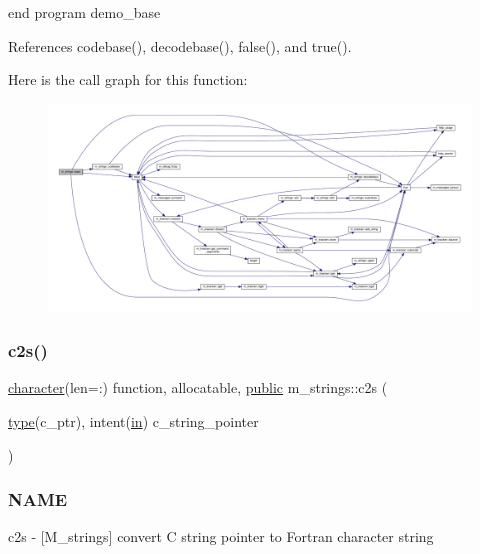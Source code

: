 end program demo\+\_\+base 

References codebase(), decodebase(), false(), and true().

Here is the call graph for this function\+:
\nopagebreak
\begin{figure}[H]
\begin{center}
\leavevmode
\includegraphics[width=350pt]{namespacem__strings_a635ef6f1dd73400e7b339392886d6357_cgraph}
\end{center}
\end{figure}
\mbox{\label{namespacem__strings_a0a8c0c16a34208351523068686cb743b}} 
\subsubsection{\texorpdfstring{c2s()}{c2s()}}
{\footnotesize\ttfamily \hyperlink{option__stopwatch_83_8txt_abd4b21fbbd175834027b5224bfe97e66}{character}(len=\+:) function, allocatable, \hyperlink{M__stopwatch_83_8txt_a2f74811300c361e53b430611a7d1769f}{public} m\+\_\+strings\+::c2s (\begin{DoxyParamCaption}\item[{\hyperlink{stop__watch_83_8txt_a70f0ead91c32e25323c03265aa302c1c}{type}(c\+\_\+ptr), intent(\hyperlink{M__journal_83_8txt_afce72651d1eed785a2132bee863b2f38}{in})}]{c\+\_\+string\+\_\+pointer }\end{DoxyParamCaption})}



\subsubsection*{N\+A\+ME}

c2s -\/ \mbox{[}M\+\_\+strings\mbox{]} convert C string pointer to Fortran character string 

